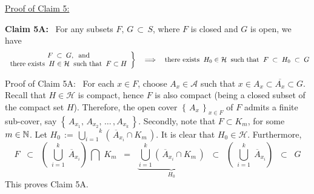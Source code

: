 \vskip 0.5cm
\noindent
\underline{Proof of Claim 5:}
\vskip 0.2cm
\begin{center}
\begin{minipage}{6.5in}
\textbf{Claim 5A:} \, For any subsets $F, \,G \,\subset\, S$, where $F$ is closed and $G$ is open, we have
\begin{equation*}
\left.
\begin{array}{c}
F \; \subset \;G, \;\;\textnormal{and} \\
\textnormal{there exists}\;\; H \in \mathcal{H} \;\;\textnormal{such that}\;\; F \subset H
\end{array}
\right\}
\quad\Longrightarrow\quad
\textnormal{there exists}\;\; H_{0} \in \mathcal{H} \;\;\textnormal{such that}\;\; F \;\subset\; H_{0} \;\subset\; G
\end{equation*}
\end{minipage}
\end{center}
Proof of Claim 5A: \,
For each $x \in F$, choose $A_{x} \in \mathcal{A}$ such that
$x \in A_{x} \subset \overline{A_{x}} \subset G$.
Recall that $H \in \mathcal{H}$ is compact, hence $F$ is also compact
(being a closed subset of the compact set $H$).
Therefore, the open cover $\left\{\,A_{x}\,\right\}_{x \in F}$ of $F$ admits a finite sub-cover,
say $\left\{\,A_{x_{1}},\,A_{x_{2}},\, \ldots\,, A_{x_{k}}\,\right\}$.
Secondly, note that $F \subset K_{m}$, for some $m \in \mathbb{N}$.
Let $H_{0} \,:=\, \overset{k}{\underset{i=1}{\bigcup}}\left(\,\overline{A}_{x_{i}} \cap K_{m}\,\right)$.
It is clear that $H_{0} \in \mathcal{H}$. Furthermore,
\begin{equation*}
F
\;\;\subset\;\; \left(\;\overset{k}{\underset{i=1}{\bigcup}}\;\overline{A}_{x_{i}}\right)\,\bigcap\;K_{m}
\;\;=\;\; \underset{H_{0}}{\underbrace{\overset{k}{\underset{i=1}{\bigcup}}\left(\,\overline{A}_{x_{i}} \cap K_{m}\,\right)}}
\;\;\subset\;\; \left(\;\overset{k}{\underset{i=1}{\bigcup}}\;\overline{A}_{x_{i}}\right)
\;\;\subset\;\; G
\end{equation*}
This proves Claim 5A.

